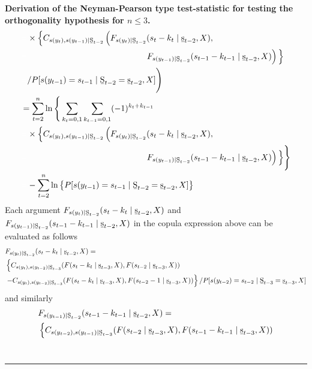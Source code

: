 \documentclass[harvard,11pt]{article}
\newenvironment{proof}[1][Proof]{\textbf{#1.} }{\  \rule{0.5em}{0.5em}}
\begin{document}
\begin{proof}[Derivation of the Neyman-Pearson type test-statistic for testing the orthogonality hypothesis for $n\leq 3$]
\begin{align*}
& \textcolor{white}{=}\times\Big\{C_{s(y_t),s(y_{t-1})\mid \text{\b{S}}%
_{t-2}}\left(F_{s(y_t)\mid \text{\b{S}}%
_{t-2} }(s_t-k_t\mid \text{\b{s}}%
_{t-2},X),\right.\\
& \textcolor{white}{=}\hspace{14em}\left.F_{s(y_{t-1})\mid \text{\b{S}}_{t-2}}(s_{t-1}-k_{t-1}\mid \text{\b{s}}_{t-2},X)\right)\Big\}\\
&\textcolor{white}{=}/P[s(y_{t-1})=s_{t-1}\mid \text{\b{S}}_{t-2}=\text{\b{s}}_{t-2},X]\Bigg)\\
&=\sum\limits_{t=2}^{n}\ln\Bigg\{\sum\limits_{k_t=0,1}\sum\limits_{k_{t-1}=0,1}(-1)^{k_t+k_{t-1}} \\
&\textcolor{white}{=} \times\Big\{C_{s(y_t),s(y_{t-1})\mid \text{\b{S}}%
_{t-2}}\left(F_{s(y_t)\mid \text{\b{S}}%
_{t-2} }(s_t-k_t\mid \text{\b{s}}%
_{t-2},X),\right.\\
& \textcolor{white}{=}\hspace{14em}\left.F_{s(y_{t-1})\mid \text{\b{S}}%
_{t-2}}(s_{t-1}-k_{t-1}\mid \text{\b{s}}%
_{t-2},X)\right)\Big\}\Bigg\}\\
&\textcolor{white}{=}-\sum\limits_{t=2}^{n}\ln\left\{P[s(y_{t-1})=s_{t-1}\mid \text{\b{S}}_{t-2}=\text{\b{s}}_{t-2},X]\right\}
\end{align*}%
\endgroup
Each argument $F_{s(y_t)\mid \text{\b{S}}%
_{t-2}}(s_t-k_t\mid \text{\b{s}}%
_{t-2},X)$ and $F_{s(y_{t-1})\mid \text{\b{S}}%
_{t-2}}(s_{t-1}-k_{t-1}\mid \text{\b{s}}%
_{t-2},X)$ in the copula expression above can be evaluated as follows
\begingroup
\allowdisplaybreaks
\begin{align*}
&F_{s(y_t)\mid\text{\b{S}}%
_{t-2}}(s_t-k_t\mid\text{\b{s}}%
_{t-2},X)=\\
&\left\{C_{s(y_t),s(y_{t-2})\mid\text{\b{S}}%
_{t-3}}(F(s_t-k_t\mid\text{\b{s}}%
_{t-3},X),F(s_{t-2}\mid\text{\b{s}}%
_{t-3},X))\right.\\
&\left.-C_{s(y_t),s(y_{t-2})\mid\text{\b{S}}%
_{t-3}}(F(s_t-k_t\mid\text{\b{s}}%
_{t-3},X),F(s_{t-2}-1\mid\text{\b{s}}%
_{t-3},X))\right\}/P[s(y_{t-2})=s_{t-2}\mid\text{\b{S}}%
_{t-3}=\text{\b{s}}%
_{t-3},X]
\end{align*}
 \endgroup
and similarly
\begingroup
\allowdisplaybreaks
\begin{align*}
&F_{s(y_{t-1})\mid\text{\b{S}}%
_{t-2}}(s_{t-1}-k_{t-1}\mid\text{\b{s}}%
_{t-2},X)=\\
&\left\{C_{s(y_{t-2}),s(y_{t-1})\mid\text{\b{S}}%
_{t-3}}(F(s_{t-2}\mid\text{\b{s}}%
_{t-3},X),F(s_{t-1}-k_{t-1}\mid\text{\b{s}}%
_{t-3},X))\right.\\

\end{align*}
\end{proof}
\end{document}
